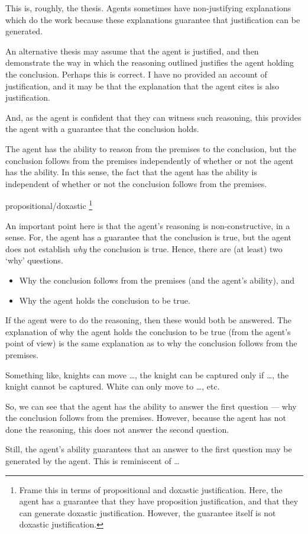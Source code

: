 \documentclass[10pt]{article}
\begin{document}
This is, roughly, the thesis.
Agents sometimes have non-justifying explanations which do the work because these explanations guarantee that justification can be generated.

An alternative thesis may assume that the agent is justified, and then demonstrate the way in which the reasoning outlined justifies the agent holding the conclusion.
Perhaps this is correct.
I have no provided an account of justification, and it may be that the explanation that the agent cites is also justification.


And, as the agent is confident that they can witness such reasoning, this provides the agent with a guarantee that the conclusion holds.

The agent has the ability to reason from the premises to the conclusion, but the conclusion follows from the premises independently of whether or not the agent has the ability.
In this sense, the fact that the agent has the ability is independent of whether or not the conclusion follows from the premises.




propositional/doxastic\nolinebreak
\footnote{
  Frame this in terms of propositional and doxastic justification.
  Here, the agent has a guarantee that they have proposition justification, and that they can generate doxastic justification.
  However, the guarantee itself is not doxastic justification.
}


\begin{note}[Constructive]
  An important point here is that the agent's reasoning is non-constructive, in a sense.
  For, the agent has a guarantee that the conclusion is true, but the agent does not establish \emph{why} the conclusion is true.
  Hence, there are (at least) two `why' questions.
  \begin{itemize}
  \item Why the conclusion follows from the premises (and the agent's ability), and
  \item Why the agent holds the conclusion to be true.
  \end{itemize}
  If the agent were to do the reasoning, then these would both be answered.
  The explanation of why the agent holds the conclusion to be true (from the agent's point of view) is the same explanation as to why the conclusion follows from the premises.

  Something like, knights can move \dots, the knight can be captured only if \dots, the knight cannot be captured.
  White can only move to \dots, etc.\

  So, we can see that the agent has the ability to answer the first question --- why the conclusion follows from the premises.
  However, because the agent has not done the reasoning, this does not answer the second question.

  Still, the agent's ability guarantees that an answer to the first question may be generated by the agent.
  This is reminiscent of \citeauthor{Davidson:2001aa} \dots
\end{note}
\end{document}
